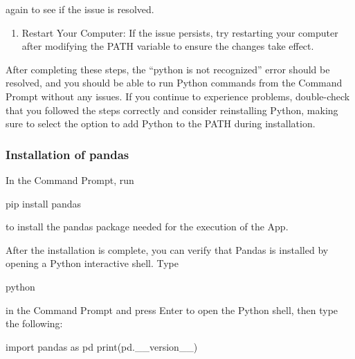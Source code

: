 \documentclass[
]{article}
\newenvironment{Shaded}{\begin{snugshade}}{\end{snugshade}}
\newcommand{\NormalTok}[1]{#1}
\providecommand{\tightlist}{%
  \setlength{\itemsep}{0pt}\setlength{\parskip}{0pt}}
\begin{document}
again to see if the issue is resolved.\\

\begin{enumerate}
\def\labelenumi{\arabic{enumi}.}
\setcounter{enumi}{7}
\tightlist
\item
  Restart Your Computer: If the issue persists, try restarting your
  computer after modifying the PATH variable to ensure the changes take
  effect.
\end{enumerate}

After completing these steps, the ``python is not recognized'' error
should be resolved, and you should be able to run Python commands from
the Command Prompt without any issues. If you continue to experience
problems, double-check that you followed the steps correctly and
consider reinstalling Python, making sure to select the option to add
Python to the PATH during installation.

\hypertarget{installation-of-pandas}{%
\subsubsection{Installation of pandas}\label{installation-of-pandas}}

In the Command Prompt, run

\begin{Shaded}
\begin{Highlighting}[]
\NormalTok{pip install pandas}
\end{Highlighting}
\end{Shaded}

to install the pandas package needed for the execution of the App.

After the installation is complete, you can verify that Pandas is
installed by opening a Python interactive shell. Type

\begin{Shaded}
\begin{Highlighting}[]
\NormalTok{python}
\end{Highlighting}
\end{Shaded}

in the Command Prompt and press Enter to open the Python shell, then
type the following:

\begin{Shaded}
\begin{Highlighting}[]
\NormalTok{import pandas as pd}
\NormalTok{print(pd.\_\_version\_\_)}
\end{Highlighting}
\end{Shaded}
\end{document}
